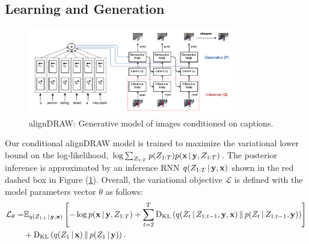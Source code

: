 \documentclass{article} %
\newcommand{\given}{\,|\,}
\newcommand{\expectation}{\mathbb{E}}
\newcommand{\kldiv}{\mathrm{D}_{\rm KL}}
\newcommand{\klBars}{\,\|\,}
\newcommand{\Lat}{Z}
\newcommand{\icaption}{{\bf{y}}}
\newcommand{\oimage}{{\bf{x}}}
\newcommand{\post}{q}
\newcommand{\prior}{p}
\newcommand{\loss}{\mathcal{L}}
\begin{document}
\vspace{-0.2cm}
\subsection{Learning and Generation}

\begin{figure}[!h]
\vspace{-0.3in}
\captionsetup[subfigure]{labelformat=empty}
\begin{center}
\includegraphics[width=0.8\textwidth]{figures/alignDrawNew.pdf}\quad
%
\end{center}
\vspace{-0.2in}
\caption{alignDRAW: Generative model of images conditioned on captions.}
\label{fig:figmodel}
\vspace{-0.2in}
\end{figure}

Our conditional alignDRAW model is trained to maximize the variational lower bound on the log-likelihood, $\log \sum_{\Lat_{1:T}} \prior(\Lat_{1:T})p(\oimage\given\icaption, \Lat_{1:T})$. The posterior inference is approximated by an inference RNN $\post(\Lat_{1:T}\given\icaption,\oimage)$ shown in the red dashed box in Figure (\ref{fig:figmodel}).   
Overall, the variational objective $\loss$ is defined with the model parameters vector $\theta$ as follows:
\begin{align}
\vspace{-0.1in}
\small
\loss_\theta =  &\expectation_{\post(\Lat_{1:t}\given\icaption,\oimage)}\left[ - \log p(\oimage\given\icaption,\Lat_{1:T}) + \sum_{t=2}^T\kldiv\left(\post(\Lat_t\given\Lat_{1:t-1},\icaption,\oimage)\klBars\prior(\Lat_t\given\Lat_{1:t-1},\icaption)\right) \right] \nonumber \\& + \kldiv\left(\post(\Lat_1\given\oimage)\klBars\prior(\Lat_1\given\icaption)\right).
\end{align}
\end{document}
